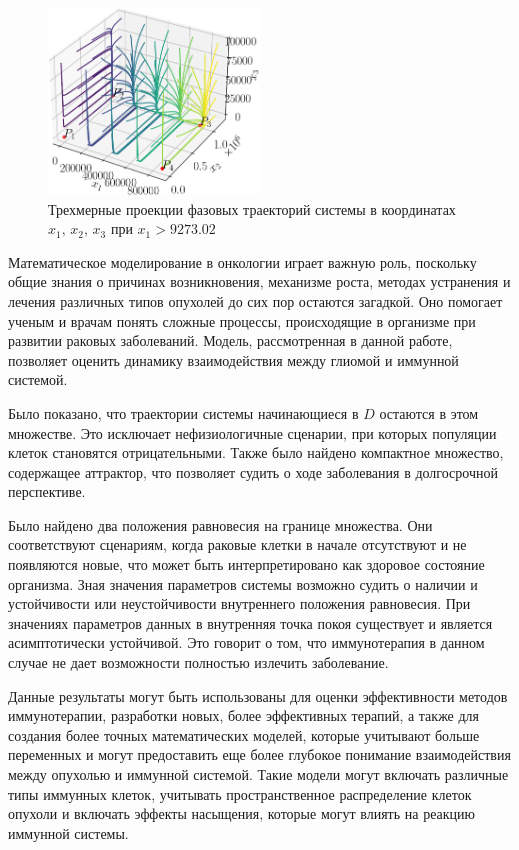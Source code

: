 \documentclass[14pt,a4paper]{extarticle}
\begin{document}
\begin{example}
		\begin{figure}[h]
			\centering
			\includegraphics[width=0.50\textwidth]{media/Figure_14.png}
			\caption{Трехмерные проекции фазовых траекторий системы в координатах $x_1,\, x_2,\, x_3$ при $x_1 > 9273.02$}
			\label{fig:model_K5_new}
		\end{figure}
	\end{example}
	
	\begin{conclusion}
	Математическое моделирование в онкологии играет важную роль, поскольку общие знания о причинах возникновения, механизме роста, методах устранения и лечения различных типов опухолей до сих пор остаются загадкой. Оно помогает ученым и врачам понять сложные процессы, происходящие в организме при развитии раковых заболеваний. Модель, рассмотренная в данной работе, позволяет оценить динамику взаимодействия между глиомой и иммунной системой.
	
	Было показано, что траектории системы начинающиеся в $D$ остаются в этом множестве. Это исключает нефизиологичные сценарии, при которых популяции клеток становятся отрицательными. Также было найдено компактное множество, содержащее аттрактор, что позволяет судить о ходе заболевания в долгосрочной перспективе.
	
	Было найдено два положения равновесия на границе множества. Они соответствуют сценариям, когда раковые клетки в начале отсутствуют и не появляются новые, что может быть интерпретировано как здоровое состояние организма. Зная значения параметров системы возможно судить о наличии и устойчивости или неустойчивости внутреннего положения равновесия. При значениях параметров данных в \cite{model_params} внутренняя точка покоя существует и является асимптотически устойчивой. Это говорит о том, что иммунотерапия в данном случае не дает возможности полностью излечить заболевание. 
	
	Данные результаты могут быть использованы для оценки эффективности методов иммунотерапии, разработки новых, более эффективных терапий, а также для создания более точных математических моделей, которые учитывают больше переменных и могут предоставить еще более глубокое понимание взаимодействия между опухолью и иммунной системой. Такие модели могут включать различные типы иммунных клеток, учитывать пространственное распределение клеток опухоли и включать эффекты насыщения, которые могут влиять на реакцию иммунной системы.
	\end{conclusion}
	
\end{document}
